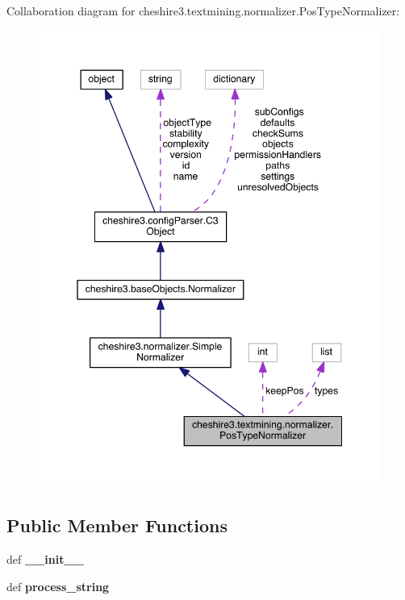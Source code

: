 Collaboration diagram for cheshire3.\-textmining.\-normalizer.\-Pos\-Type\-Normalizer\-:
\nopagebreak
\begin{figure}[H]
\begin{center}
\leavevmode
\includegraphics[width=348pt]{classcheshire3_1_1textmining_1_1normalizer_1_1_pos_type_normalizer__coll__graph}
\end{center}
\end{figure}
\subsection*{Public Member Functions}
\begin{DoxyCompactItemize}
\item 
\hypertarget{classcheshire3_1_1textmining_1_1normalizer_1_1_pos_type_normalizer_a71211526bb7ed92ea7e72204b711ce7c}{def {\bfseries \-\_\-\-\_\-init\-\_\-\-\_\-}}\label{classcheshire3_1_1textmining_1_1normalizer_1_1_pos_type_normalizer_a71211526bb7ed92ea7e72204b711ce7c}

\item 
\hypertarget{classcheshire3_1_1textmining_1_1normalizer_1_1_pos_type_normalizer_a9a57cc7307a2af0e33ffc9da88edf06b}{def {\bfseries process\-\_\-string}}\label{classcheshire3_1_1textmining_1_1normalizer_1_1_pos_type_normalizer_a9a57cc7307a2af0e33ffc9da88edf06b}

\end{DoxyCompactItemize}
